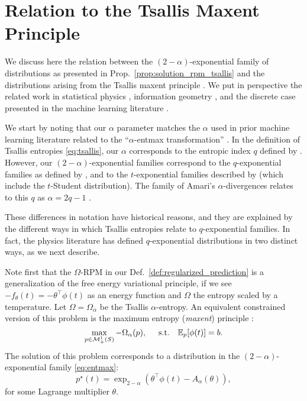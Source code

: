 \documentclass{article}
\begin{document}
\section{Relation to the Tsallis Maxent Principle}\label{sec:tsallis_maxent}

We discuss here the relation between the $(2-\alpha)$-exponential family of distributions as presented in Prop.~\ref{prop:solution_rpm_tsallis} and the distributions arising from the Tsallis maxent principle \citep{Tsallis1988}. We put in perspective the related work in statistical physics \citep{abe2003geometry,naudts2009q}, information geometry \citep{amari2011geometry,amari2016information}, and the discrete case presented in the machine learning literature \citep{blondel2020learning,peters2019sparse}. 

We start by noting that our $\alpha$ parameter matches the $\alpha$ used in prior machine learning literature related to the ``$\alpha$-entmax transformation'' \citep{blondel2020learning,peters2019sparse}. In the definition of Tsallis entropies  \eqref{eq:tsallis}, our $\alpha$ corresponds to the entropic index $q$ defined by \citet{Tsallis1988}. 
However, our $(2-\alpha)$-exponential families correspond to the $q$-exponential families as defined by \citet{naudts2009q}, and to the $t$-exponential families described by \citet{ding2010t} (which include the $t$-Student distribution). The family of Amari's $\alpha$-divergences relates to this $q$ as $\alpha=2q-1$ \citep[\S4.3]{amari2016information}. 

These differences in notation have historical reasons, and they are explained by the different ways in which Tsallis entropies relate to $q$-exponential families. 
In fact, the physics literature has defined $q$-exponential distributions in two distinct ways, as we next describe. 

Note first that the $\Omega$-RPM in our  Def.~\ref{def:regularized_prediction} is a generalization of the free energy variational principle, if we see $-f_\theta(t) = -\theta^\top \phi(t)$ as an energy function and $\Omega$ the entropy scaled by a temperature. 
Let $\Omega = \Omega_\alpha$ be the Tsallis $\alpha$-entropy. 
An equivalent constrained version of this problem is the maximum entropy ({\it maxent}) principle \citep{jaynes1957information}:
\begin{equation}\label{eq:constrained_maxent}
\max_{p \in \mathcal{M}_+^1(S)}  -\Omega_\alpha(p), \hspace{0.5cm} \mathrm{s.t.}  \hspace{0.35cm} \mathbb{E}_{p}[\phi(t)] = b.
\end{equation}
The solution of this problem corresponds to a distribution in the $(2-\alpha)$-exponential family \eqref{eq:entmax}:
\begin{equation}\label{eq:sol_maxent}
    p^\star(t) = \exp_{2-\alpha}(\theta^\top \phi(t) - A_\alpha(\theta)),
\end{equation}
for some Lagrange multiplier $\theta$. 
\end{document}
